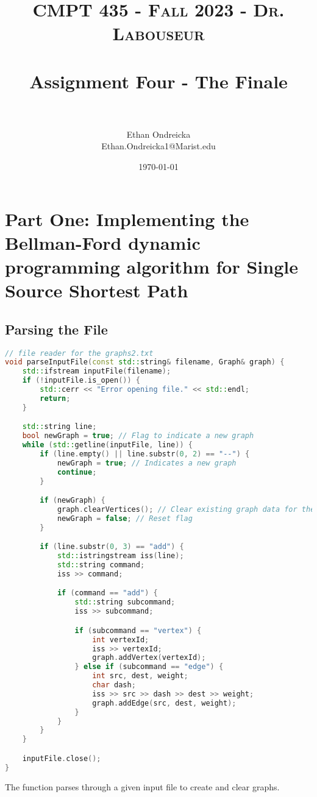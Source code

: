 \documentclass[letterpaper, 10pt,DIV=13]{scrartcl}
\title{	
   \normalfont \normalsize 
   \textsc{CMPT 435 - Fall 2023 - Dr. Labouseur} \\[10pt] %
   \horrule{0.5pt} \\[0.25cm] 	%
   \huge Assignment Four - The Finale  \\     	    %
   \horrule{0.5pt} \\[0.25cm] 	%
}
\author{Ethan Ondreicka \\ \normalsize Ethan.Ondreicka1@Marist.edu}
\date{\normalsize\today} 	%
\numberwithin{equation}{section} %
\numberwithin{figure}{section} %
\numberwithin{table}{section} %
\begin{document}
\maketitle %

\section{Part One: Implementing	the	Bellman-Ford dynamic programming algorithm for Single Source Shortest	Path}

\subsection{Parsing the File}

\begin{lstlisting}[language=c++, caption= Parsing through the input file]
// file reader for the graphs2.txt
void parseInputFile(const std::string& filename, Graph& graph) {
    std::ifstream inputFile(filename);
    if (!inputFile.is_open()) {
        std::cerr << "Error opening file." << std::endl;
        return;
    }

    std::string line;
    bool newGraph = true; // Flag to indicate a new graph
    while (std::getline(inputFile, line)) {
        if (line.empty() || line.substr(0, 2) == "--") {
            newGraph = true; // Indicates a new graph
            continue;
        }

        if (newGraph) {
            graph.clearVertices(); // Clear existing graph data for the new graph
            newGraph = false; // Reset flag
        }

        if (line.substr(0, 3) == "add") {
            std::istringstream iss(line);
            std::string command;
            iss >> command;

            if (command == "add") {
                std::string subcommand;
                iss >> subcommand;

                if (subcommand == "vertex") {
                    int vertexId;
                    iss >> vertexId;
                    graph.addVertex(vertexId);
                } else if (subcommand == "edge") {
                    int src, dest, weight;
                    char dash;
                    iss >> src >> dash >> dest >> weight;
                    graph.addEdge(src, dest, weight);
                }
            }
        }
    }

    inputFile.close();
}
\end{lstlisting}
The function parses through a given input file to create and clear graphs.
\end{document}
